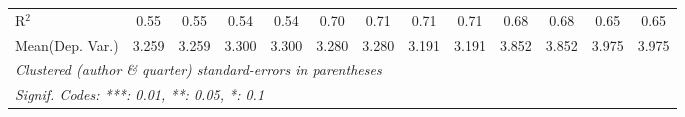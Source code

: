 \begin{tabular}{lcccccccccccc}
   R$^2$                                    & 0.55    & 0.55    & 0.54         & 0.54    & 0.70        & 0.71          & 0.71        & 0.71           & 0.68    & 0.68         & 0.65    & 0.65\\  
Mean(Dep. Var.) & 3.259 & 3.259 & 3.300 & 3.300 & 3.280 & 3.280 & 3.191 & 3.191 & 3.852 & 3.852 & 3.975 & 3.975 \\
   \midrule \midrule
   \multicolumn{13}{l}{\emph{Clustered (author \& quarter) standard-errors in parentheses}}\\
   \multicolumn{13}{l}{\emph{Signif. Codes: ***: 0.01, **: 0.05, *: 0.1}}\\
\end{tabular}
\par\endgroup
